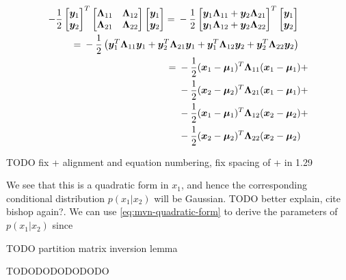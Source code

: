 \begin{align}
    \begin{split}
    -\frac{1}{2} \begin{bmatrix} {\bm{y}}_1 \\ {\bm{y}}_2 \end{bmatrix} ^T {\begin{bmatrix} {{\bm{\Lambda}}_{11}} & {{\bm{\Lambda}}_{12}} \\ {{\bm{\Lambda}}_{21}} & {{\bm{\Lambda}}_{22}} \end{bmatrix}} \begin{bmatrix} {\bm{y}}_1 \\ {\bm{y}}_2 \end{bmatrix} ={}& -\frac{1}{2} \begin{bmatrix} {\bm{y}}_1 {{\bm{\Lambda}}_{11}} + {\bm{y}}_2 {{\bm{\Lambda}}_{21}} \\ {\bm{y}}_1 {{\bm{\Lambda}}_{12}} + {\bm{y}}_2 {{\bm{\Lambda}}_{22}} \end{bmatrix} ^T \begin{bmatrix} {\bm{y}}_1 \\ {\bm{y}}_2 \end{bmatrix}
    \end{split} \\
    \begin{split}
    ={}& -\frac{1}{2} \left( {\bm{y}}_1^T {{\bm{\Lambda}}_{11}} {\bm{y}}_1 + {\bm{y}}_2^T {{\bm{\Lambda}}_{21}} {\bm{y}}_1 + {\bm{y}}_1^T {{\bm{\Lambda}}_{12}} {\bm{y}}_2 + {\bm{y}}_2^T {{\bm{\Lambda}}_{22}} {\bm{y}}_2 \right)
    \end{split} \\
    \begin{split}
    ={}& -\frac{1}{2} ({\bm{x}}_1 - {\bm{\mu}}_1)^T {{\bm{\Lambda}}_{11}} ({\bm{x}}_1 - {\bm{\mu}}_1) {}+ \\
      &-\frac{1}{2} ({\bm{x}}_2 - {\bm{\mu}}_2)^T {{\bm{\Lambda}}_{21}} ({\bm{x}}_1 - {\bm{\mu}}_1) {}+ \\
      &-\frac{1}{2} ({\bm{x}}_1 - {\bm{\mu}}_1)^T {{\bm{\Lambda}}_{12}} ({\bm{x}}_2 - {\bm{\mu}}_2) {}+ \\
      &-\frac{1}{2} ({\bm{x}}_2 - {\bm{\mu}}_2)^T {{\bm{\Lambda}}_{22}} ({\bm{x}}_2 - {\bm{\mu}}_2) \label{eq:mvn-quadratic-form}
    \end{split}
\end{align}

{TODO fix + alignment and equation numbering, fix spacing of + in 1.29}

We see that this is a quadratic form in $x_1$, and hence the corresponding conditional distribution $p(x_1 | x_2)$ will be Gaussian. {TODO better explain, cite bishop again?}. We can use \eqref{eq:mvn-quadratic-form} to derive the parameters of $p(x_1 | x_2)$ since

{TODO partition matrix inversion lemma}

\citep{murphy2012machine}




TODODODODODODO


